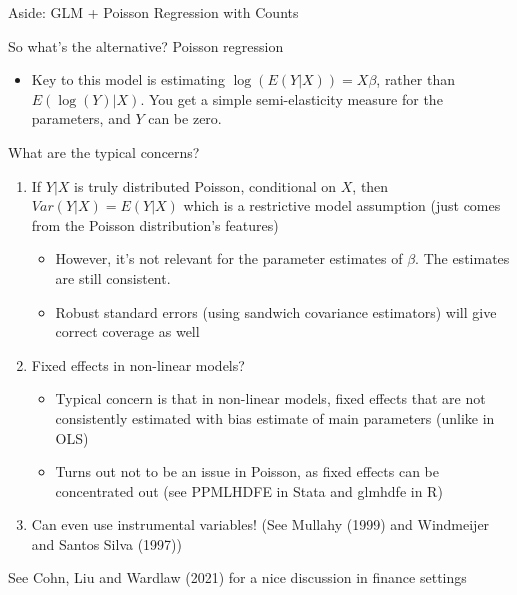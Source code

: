 \documentclass[notes,11pt, aspectratio=169]{beamer}
\newenvironment{wideitemize}{\itemize\addtolength{\itemsep}{10pt}}{\enditemize}
\begin{document}
  \begin{frame}{Aside: GLM + Poisson Regression with Counts}
    \begin{wideitemize}
    \item So what's the alternative? Poisson regression
      \begin{itemize}
      \item Key to this model is estimating $\log(E(Y|X)) = X\beta$,
        rather than $E(\log(Y)|X)$. You get a simple semi-elasticity
        measure for the parameters, and $Y$ can be zero.
      \end{itemize}
    \item What are the typical concerns?
      \begin{enumerate}
      \item       If $Y | X$ is truly distributed
      Poisson, conditional on $X$, then $Var(Y|X) = E(Y|X)$ which is a
      restrictive model assumption (just comes from the Poisson
      distribution's features)
      \begin{itemize}
      \item However, it's not relevant for the parameter estimates of
        $\beta$. The estimates are still consistent.
      \item Robust standard errors (using sandwich covariance
        estimators) will give correct coverage as well
      \end{itemize}
    \item Fixed effects in non-linear models?
      \begin{itemize}
      \item Typical concern is that in non-linear models, fixed
        effects that are not consistently estimated with bias estimate
        of main parameters (unlike in OLS)
      \item Turns out not to be an issue in Poisson, as fixed effects
        can be concentrated out (see PPMLHDFE in Stata and glmhdfe in
        R)
      \end{itemize}
    \item Can even use instrumental variables! (See Mullahy (1999) and
      Windmeijer and Santos Silva (1997))
    \end{enumerate}
  \item See Cohn, Liu and Wardlaw (2021) for a nice discussion in finance settings
    \end{wideitemize}
  \end{frame}
\end{document}
